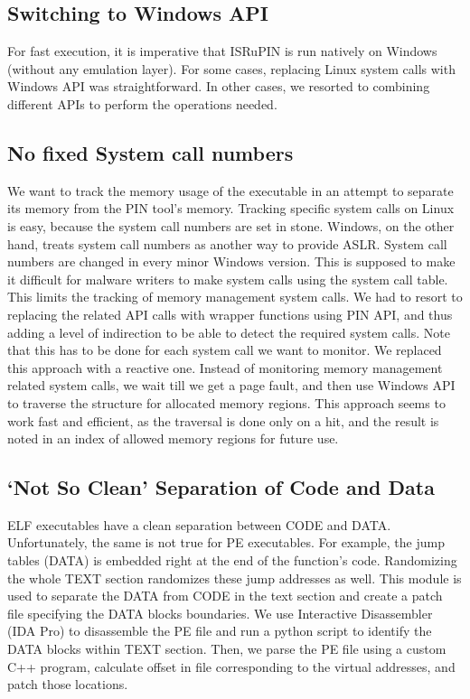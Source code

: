 \documentclass[a4paper,12pt]{llncs}
\begin{document}
\subsection{Switching to Windows API}
For fast execution, it is imperative that ISRuPIN is run natively on Windows (without any emulation layer). For some cases, replacing Linux system calls with Windows API was straightforward. In other cases, we resorted to combining different APIs to perform the operations needed.

\subsection{No fixed System call numbers}
We want to track the memory usage of the executable in an attempt to separate its memory from the PIN tool's memory. Tracking specific system calls on Linux is easy, because the system call numbers are set in stone. Windows, on the other hand, treats system call numbers as another way to provide ASLR. System call numbers are changed in every minor Windows version. This is supposed to make it difficult for malware writers to make system calls using the system call table. This limits the tracking of memory management system calls. We had to resort to replacing the related API calls with wrapper functions using PIN API, and thus adding a level of indirection to be able to detect the required system calls. Note that this has to be done for each system call we want to monitor. We replaced this approach with a reactive one. Instead of monitoring memory management related system calls, we wait till we get a page fault, and then use Windows API to traverse the structure for allocated memory regions. This approach seems to work fast and efficient, as the traversal is done only on a hit, and the result is noted in an index of allowed memory regions for future use.

\subsection{`Not So Clean' Separation of Code and Data}
ELF executables have a clean separation between CODE and DATA. Unfortunately, the same is not true for PE executables. For example, the jump tables (DATA) is embedded right at the end of the function's code. Randomizing the whole TEXT section randomizes these jump addresses as well. This module is used to separate the DATA from CODE in the text section and create a patch file specifying the DATA blocks boundaries. We use Interactive Disassembler (IDA Pro) to disassemble the PE file and run a python script to identify the DATA blocks within TEXT section. Then, we parse the PE file using a custom C++ program, calculate offset in file corresponding to the virtual addresses, and patch those locations.
\end{document}
